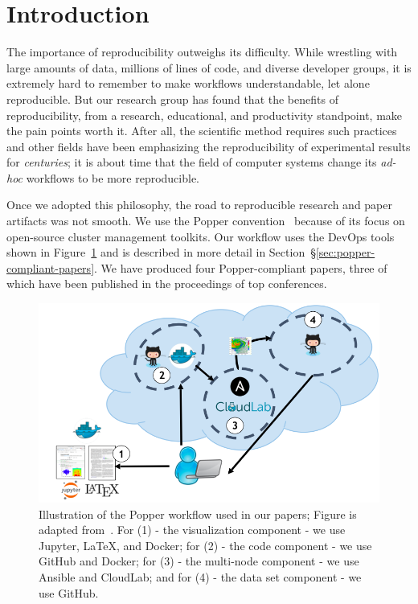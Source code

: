\section{Introduction}

The importance of reproducibility outweighs its difficulty. While wrestling
with large amounts of data, millions of lines of code, and diverse developer
groups, it is extremely  hard to remember to make workflows understandable, let
alone reproducible. But our research group has found  that the benefits of
reproducibility, from a research, educational, and productivity standpoint,
make the pain points worth it. After all, the scientific method requires such
practices  and other fields have been emphasizing the reproducibility of
experimental results for {\it centuries}; it is about time that the field of
computer systems change its {\it ad-hoc} workflows to be more reproducible.

Once we adopted this philosophy, the road to reproducible research and paper
artifacts was not smooth.  We use the Popper
convention~\cite{jimenez:ipdpsw17-popper} because of its focus on open-source
cluster management toolkits. Our workflow uses the DevOps tools shown in
Figure~\ref{fig:workflow} and is described in more detail in
Section~\S\ref{sec:popper-compliant-papers}. We have produced four
Popper-compliant papers, three of which have been published in the proceedings
of top conferences.

\begin{figure}[tb] 
  \centering
  \includegraphics[width=1\linewidth]{./figures/workflow.png}
  \caption{Illustration of the Popper workflow used in our papers; Figure is
adapted from~\cite{jimenez:ipdpsw17-popper}. For (1) - the visualization
component - we use Jupyter, \LaTeX, and Docker; for (2) - the code component -
we use GitHub and Docker; for (3) - the multi-node component - we use Ansible
and CloudLab; and for (4) - the data set component - we use GitHub.}
  \label{fig:workflow}
\end{figure}


